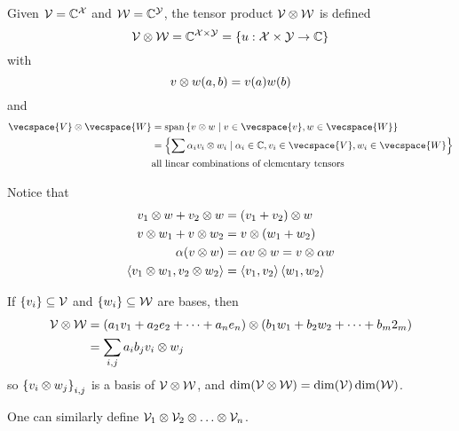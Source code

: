 \begin{definition}
    Given $\mathcal{V} = \mathbb{C}^{\mathcal{X}}$ and $\mathcal{W} = \mathbb{C}^{\mathcal{Y}}$, the tensor product $\mathcal{V} \otimes \mathcal{W}$ is defined
    \[\mathcal{V} \otimes \mathcal{W} = \mathbb{C}^{\mathcal{X} \times \mathcal{Y}} = \left\lbrace u:\mathcal{X} \times \mathcal{Y} \to \mathbb{C}\right\rbrace\]
    with
    \[v \otimes w(a, b) = v(a)w(b)\]
    and
    \begin{align*}\vecspace{V} \tensorprod \vecspace{W}
         & = \spanset\set{v \tensorprod w \suchthat v \in \vecspace{v}, w \in \vecspace{W}}                                          \\
         & = \set{\sum \alpha_i v_i \tensorprod w_i \suchthat \alpha_i \in \complexnums, v_i \in \vecspace{V}, w_i \in \vecspace{W}} \\
         & \hbox{all linear combinations of elementary tensors}
    \end{align*}
\end{definition}

Notice that
\begin{align*}
    v_1 \otimes w + v_2 \otimes w                   & = (v_1 + v_2)\otimes w                       \\
    v\otimes w_1 + v \otimes w_2                    & = v \otimes (w_1 + w_2)                      \\
    \alpha(v\otimes w)                                  & = \alpha v\otimes w = v \otimes \alpha w \\
    \left\langle v_1 \otimes w_1, v_2 \otimes w_2\right\rangle & = \left\langle v_1, v_2\right\rangle\left\langle w_1, w_2\right\rangle
\end{align*}

If $\left\lbrace v_i\right\rbrace \subseteq \mathcal{V}$ and $\left\lbrace w_i\right\rbrace \subseteq \mathcal{W}$ are bases,
then
\begin{align*}\mathcal{V} \otimes \mathcal{W}
     & = \left(a_1 v_1 + a_2 e_2 + \dots + a_n e_n\right) \otimes \left(b_1 w_1 + b_2 w_2 + \dots + b_m 2_m\right) \\
     & = \sum_{i,j} a_ib_j v_i\otimes w_j
\end{align*}
so $\left\lbrace v_i \otimes w_j\right\rbrace_{i,j}$ is a basis of $\mathcal{V} \otimes \mathcal{W}$, and
$\dim(\mathcal{V} \otimes \mathcal{W}) = \dim(\mathcal{V})\dim(\mathcal{W})$.

One can similarly define $\vecspace{V}_1 \tensorprod \vecspace{V}_2 \tensorprod \dots \tensorprod \vecspace{V}_n$.

